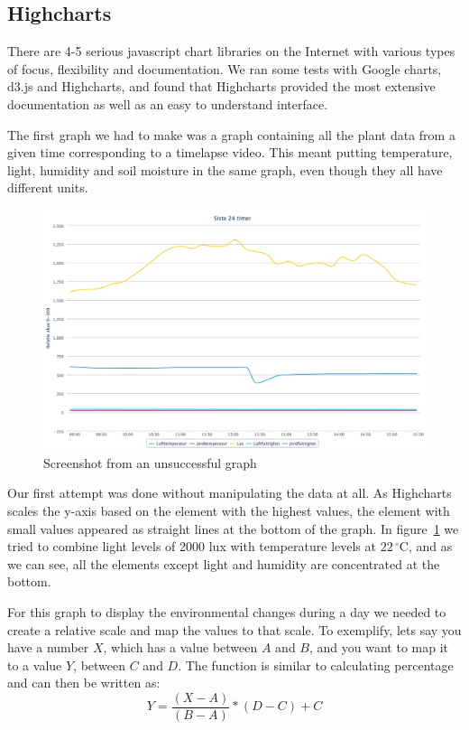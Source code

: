 \subsection{Highcharts}
There are 4-5 serious javascript chart libraries on the Internet with various types of focus, flexibility and documentation. We ran some tests with Google charts, d3.js and Highcharts, and found that Highcharts provided the most extensive documentation as well as an easy to understand interface. 

The first graph we had to make was a graph containing all the plant data from a given time corresponding to a timelapse video. This meant putting temperature, light, humidity and soil moisture in the same graph, even though they all have different units. 



\begin{figure}
\centering
\includegraphics[width=1\textwidth]{img/interface/badgraph.png}
\caption{Screenshot from an unsuccessful graph}
\label{fig:badgraph}
\end{figure}

Our first attempt was done without manipulating the data at all. As Highcharts scales the y-axis based on the element with the highest values, the element with small values appeared as straight lines at the bottom of the graph. In figure~\ref{fig:badgraph} we tried to combine light levels of 2000 lux with temperature levels at $22\,^{\circ}\mathrm{C}$, and as we can see, all the elements except light and humidity are concentrated at the bottom. 

For this graph to display the environmental changes during a day we needed to create a relative scale and map the values to that scale. To exemplify, lets say you have a number \ensuremath{X}, which has a value between \ensuremath{A} and \ensuremath{B}, and you want to map it to a value \ensuremath{Y}, between \ensuremath{C} and \ensuremath{D}. The function is similar to calculating percentage and can then be written as: 
\begin{equation}
Y = \frac{(X-A)}{(B-A)} * (D-C) + C
\end{equation}

